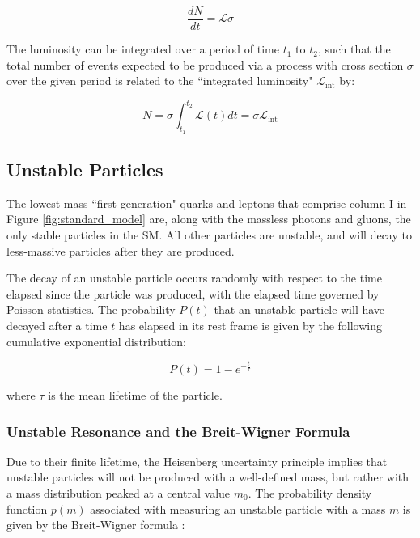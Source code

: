 \begin{equation}
\frac{dN}{dt} = \mathcal{L}\sigma
\end{equation}

The luminosity can be integrated over a period of time \(t_1\) to \(t_2\), such that the total number of events expected to be produced via a process with cross section \(\sigma\) over the given period is related to the ``integrated luminosity" \(\mathcal{L}_\text{int}\) by:

\begin{equation}
\label{eq:integrated_lumi}
N = \sigma\int_{t_1}^{t_2}\mathcal{L}(t)dt = \sigma\mathcal{L}_\text{int}
\end{equation}

\subsection{Unstable Particles}

The lowest-mass ``first-generation" quarks and leptons that comprise column I in Figure \ref{fig:standard_model} are, along with the massless photons and gluons, the only stable particles in the SM. All other particles are unstable, and will decay to less-massive particles after they are produced. 

The decay of an unstable particle occurs randomly with respect to the time elapsed since the particle was produced, with the elapsed time governed by Poisson statistics. The probability \(P(t)\) that an unstable particle will have decayed after a time \(t\) has elapsed in its rest frame is given by the following cumulative exponential distribution:

\begin{equation}
\label{eq:particle_decay}
P(t) = 1-e^{-\frac{t}{\tau}} %
\end{equation}

\noindent where \(\tau\) is the mean lifetime of the particle.


\subsubsection{Unstable Resonance and the Breit-Wigner Formula}

Due to their finite lifetime, the Heisenberg uncertainty principle implies that unstable particles will not be produced with a well-defined mass, but rather with a mass distribution peaked at a central value \(m_0\). The probability density function \(p(m)\) associated with measuring an unstable particle with a mass \(m\) is given by the Breit-Wigner formula \cite{breit_wigner}:

